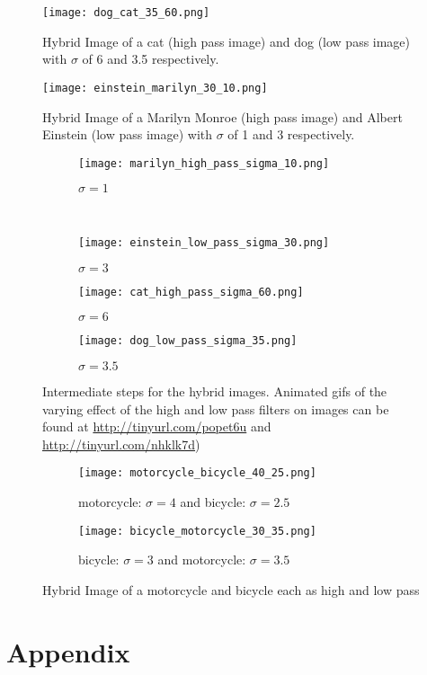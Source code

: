 \documentclass[a4paper,10pt]{article}
\begin{document}
\begin{figure}[ht!]
    \centering
    \texttt{[image: dog\_cat\_35\_60.png]}
    \caption{Hybrid Image of a cat (high pass image) and dog (low pass image)
             with $\sigma$ of 6 and 3.5 respectively. \label{fig:dog_cat}}
\end{figure}

\begin{figure}[ht!]
    \centering
    \texttt{[image: einstein\_marilyn\_30\_10.png]}
    \caption{Hybrid Image of a Marilyn Monroe (high pass image) and Albert
             Einstein (low pass image) with $\sigma$ of 1 and 3 respectively.
             \label{fig:einstein_marilyn}}
\end{figure}

\begin{figure}[ht!]
    \centering
    \begin{subfigure}[b]{0.2\textwidth}
        \texttt{[image: marilyn\_high\_pass\_sigma\_10.png]}
        \caption{$\sigma = 1$\label{fig:high_marilyn}}
    \end{subfigure}
    ~%
    \begin{subfigure}[b]{0.2\textwidth}
        \texttt{[image: einstein\_low\_pass\_sigma\_30.png]}
        \caption{$\sigma = 3$\label{fig:low_einstein}}
    \end{subfigure}
    \begin{subfigure}[b]{0.2\textwidth}
        \texttt{[image: cat\_high\_pass\_sigma\_60.png]}
        \caption{$\sigma = 6$\label{fig:high_cat}}
    \end{subfigure}
    \begin{subfigure}[b]{0.2\textwidth}
        \texttt{[image: dog\_low\_pass\_sigma\_35.png]}
        \caption{$\sigma = 3.5$\label{fig:low_dog}}
    \end{subfigure}
\caption{Intermediate steps for the hybrid images. Animated gifs of the
         varying effect of the high and low pass filters on images can be found
         at \url{http://tinyurl.com/popet6u} and
         \url{http://tinyurl.com/nhklk7d})  \label{fig:intermediate}}
\end{figure}

\begin{figure}[ht!]
    \centering
    \begin{subfigure}[b]{\textwidth}
        \texttt{[image: motorcycle\_bicycle\_40\_25.png]}
        \caption{motorcycle: $\sigma = 4$ and bicycle: $\sigma = 2.5$
                 \label{fig:moto_bike}}
    \end{subfigure}
    \begin{subfigure}[b]{\textwidth}
        \texttt{[image: bicycle\_motorcycle\_30\_35.png]}
        \caption{bicycle: $\sigma = 3$ and motorcycle: $\sigma = 3.5$
                 \label{fig:bike_moto}}
    \end{subfigure}
\caption{Hybrid Image of a motorcycle and bicycle each as high and low pass
         \label{fig:order_pass}}
\end{figure}

\newpage
\section{Appendix}


\end{document}
